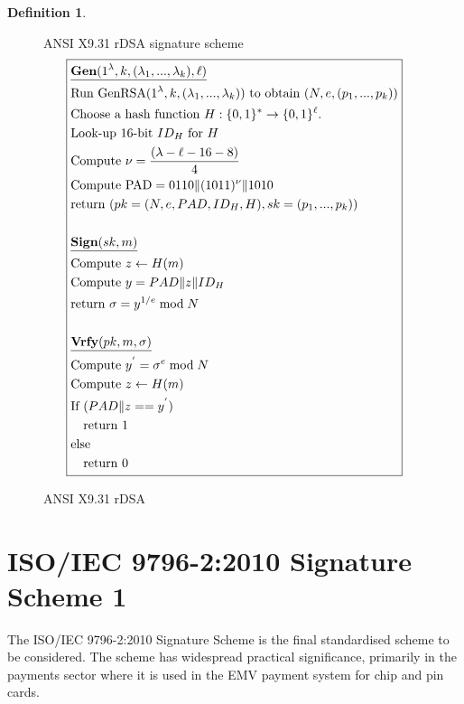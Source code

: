 \documentclass[]{final_report}
\theoremstyle{definition}
\newtheorem{definition}{Definition}[chapter]
\begin{document}
\begin{definition}
\begin{figure}[H]
\centering
\hfill ANSI X9.31 rDSA signature scheme\hfill\phantom{} 
\[
\boxed{
\begin{aligned}
&\underline{\textbf{\text{Gen}} (1^\lambda, k, (\lambda_{1},...,\lambda_{k}), \ell)} \\
&\text{Run GenRSA}(1^\lambda, k, (\lambda_{1},...,\lambda_{k})) \text{ to obtain } (N, e,  (p_{1},...,p_{k})) \\
&\text{Choose a hash function } H : \{0, 1\}^* \rightarrow \{0, 1\}^\ell. \\
&\text{Look-up } 16\text{-bit } ID_{H} \text{ for } H \\
&\text{Compute } \nu = \frac{(\lambda - \ell - 16 - 8)}{4} \\
&\text{Compute PAD} = 0110 \| (1011)^{\nu} \| 1010 \\
&\text{return } (pk = (N, e, PAD, ID_{H}, H), sk =  (p_{1},...,p_{k})) \\
\\
&\underline{\textbf{\text{Sign}} (sk, m)} \\
&\text{Compute } z \leftarrow H(m) \\
&\text{Compute } y = PAD  \| z \| ID_{H} \\
&\text{return } \sigma = y^{1/e} \bmod N \\
\\
&\underline{\textbf{\text{Vrfy}} (pk, m, \sigma)} \\
&\text{Compute } y^{'} = \sigma^{e} \bmod N \\
&\text{Compute } z \leftarrow H(m) \\
&\text{If } (PAD \| z == y^{'}) \\
&\quad \text{return } 1 \\
&\text{else} \\
&\quad \text{return } 0 
\end{aligned}
}
\]
\caption{ANSI X9.31 rDSA}
\label{fig:ansix931}
\end{figure}
\end{definition}


\section{ISO/IEC 9796-2:2010 Signature Scheme 1}
The ISO/IEC 9796-2:2010 \cite{ISO/2010/9796-2-2010} Signature Scheme is the final standardised scheme to be considered. The scheme has widespread practical significance, primarily in the payments sector where it is used in the EMV payment system for chip and pin cards. 
\end{document}
